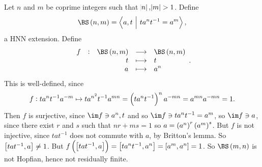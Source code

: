 \begin{example}
Let $ n $ and $ m $ be coprime integers such that $ \abs{n}, \abs{m} > 1 $. Define
$$ \BS\br{n, m} = \abr{a, t \st ta^nt^{-1} = a^m}, $$
a HNN extension. Define
$$ \functions[f]{\BS\br{n, m}}{\BS\br{n, m}}{t}{t}{a}{a^n}. $$
This is well-defined, since
$$ f : ta^nt^{-1}a^{-m} \mapsto ta^{n^2}t^{-1}a^{mn} = \br{ta^nt^{-1}}^na^{-mn} = a^{mn}a^{-mn} = 1. $$
Then $ f $ is surjective, since $ \im f \ni a^n, t $ and so $ \im f \ni ta^nt^{-1} = a^m $, so $ \im f \ni a $, since there exist $ r $ and $ s $ such that $ nr + ms = 1 $ so $ a = \br{a^n}^r\br{a^m}^s $. But $ f $ is not injective, since $ tat^{-1} $ does not commute with $ a $, by Britton's lemma. So $ \sbr{tat^{-1}, a} \ne 1 $. But $ f\br{\sbr{tat^{-1}, a}} = \sbr{ta^nt^{-1}, a^n} = \sbr{a^m, a^n} = 1 $. So $ \BS\br{m, n} $ is not Hopfian, hence not residually finite.
\end{example}

